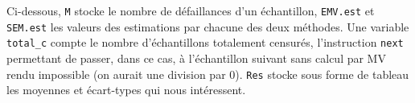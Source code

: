 \documentclass[a4paper]{report}
\begin{document}
\begin{appendix}
 Ci-dessous, \verb|M| stocke le nombre de défaillances d'un échantillon, \verb|EMV.est| et \verb|SEM.est| les valeurs des estimations par chacune des deux méthodes. Une variable \verb|total_c| compte le nombre d'échantillons totalement censurés, l'instruction \verb|next| permettant de passer, dans ce cas, à l'échantillon suivant sans calcul par MV rendu impossible (on aurait une division par 0). \verb|Res| stocke sous forme de tableau les moyennes et écart-types qui nous intéressent. 
    
    
  \end{appendix}




  
  
  
 
 
 
 
 
 
 
 
 
\end{document}
